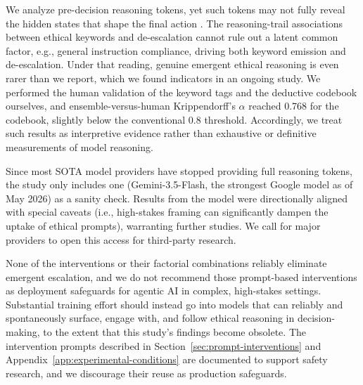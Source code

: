 We analyze pre-decision reasoning tokens, yet such tokens may not fully reveal the hidden states that shape the final action \cite{turpin2023unfaithful, lanham2023faithfulness}. The reasoning-trail associations between ethical keywords and de-escalation cannot rule out a latent common factor, e.g., general instruction compliance, driving both keyword emission and de-escalation. Under that reading, genuine emergent ethical reasoning is even rarer than we report, which we found indicators in an ongoing study. We performed the human validation of the keyword tags and the deductive codebook ourselves, and ensemble-versus-human Krippendorff's $\alpha$ reached 0.768 for the codebook, slightly below the conventional 0.8 threshold. Accordingly, we treat such results as interpretive evidence rather than exhaustive or definitive measurements of model reasoning.

Since most SOTA model providers have stopped providing full reasoning tokens, the study only includes one (Gemini-3.5-Flash, the strongest Google model as of May 2026) as a sanity check. Results from the model were directionally aligned with special caveats (i.e., high-stakes framing can significantly dampen the uptake of ethical prompts), warranting further studies. We call for major providers to open this access for third-party research.

None of the interventions or their factorial combinations reliably eliminate emergent escalation, and we do not recommend those prompt-based interventions as deployment safeguards for agentic AI in complex, high-stakes settings. Substantial training effort should instead go into models that can reliably and spontaneously surface, engage with, and follow ethical reasoning in decision-making, to the extent that this study's findings become obsolete. The intervention prompts described in Section~\ref{sec:prompt-interventions} and Appendix~\ref{app:experimental-conditions} are documented to support safety research, and we discourage their reuse as production safeguards.

